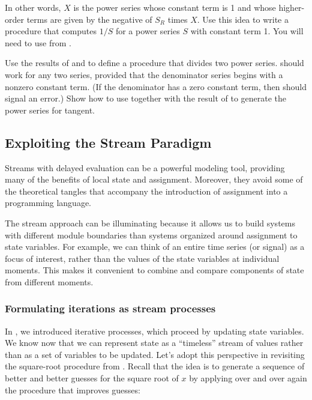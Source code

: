 \begin{exerciseGroup}
In other words, \( X \) is the power series whose constant term is 1 and whose
higher-order terms are given by the negative of \( S_R \) times \( X \).  Use
this idea to write a procedure  that computes \( 1 / S \)
for a power series \( S \) with constant term 1.  You will need to use
 from .

\label{Exercise 3.62}
 Use the results of 
and  to define a procedure  that
divides two power series.   should work for any two series,
provided that the denominator series begins with a nonzero constant term.  (If
the denominator has a zero constant term, then  should signal
an error.)  Show how to use  together with the result of
 to generate the power series for tangent.
\end{exerciseGroup}

\subsection{Exploiting the Stream Paradigm}
\label{Section 3.5.3}

Streams with delayed evaluation can be a powerful modeling tool, providing many
of the benefits of local state and assignment.  Moreover, they avoid some of
the theoretical tangles that accompany the introduction of assignment into a
programming language.

The stream approach can be illuminating because it allows us to build systems
with different module boundaries than systems organized around assignment to
state variables.  For example, we can think of an entire time series (or
signal) as a focus of interest, rather than the values of the state variables
at individual moments.  This makes it convenient to combine and compare
components of state from different moments.

\subsubsection*{Formulating iterations as stream processes}

In , we introduced iterative processes, which proceed by
updating state variables.  We know now that we can represent state as a
``timeless'' stream of values rather than as a set of variables to be updated.
Let's adopt this perspective in revisiting the square-root procedure from
.  Recall that the idea is to generate a sequence of better
and better guesses for the square root of \( x \) by applying over and over again
the procedure that improves guesses:

